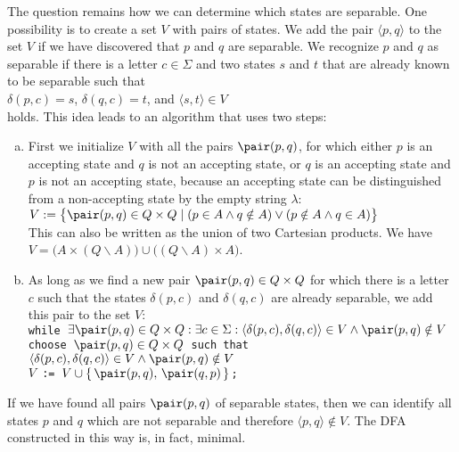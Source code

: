 The question remains how we can determine which states are separable.
One possibility is to create a set $V$ with pairs of states.  We add the pair $\langle p, q \rangle$ to the set
$V$ if we have discovered that $p$ and $q$ are separable.  We recognize $p$ and $q$ as separable if
there is a letter $c\in\Sigma$ and two states $s$ and $t$ that are already known to be separable such that 
\\[0.2cm]
\hspace*{1.3cm}
$\delta(p,c) = s$, \quad $\delta(q,c) = t$, \quad and \quad $\langle s, t \rangle \in V$
\\[0.2cm]
holds. This idea leads to an algorithm that uses two steps:
\begin{enumerate}[(a)]
\item First we initialize $V$ with all the pairs $\pair(p,q)$, for which either $p$ is an accepting state and
      $q$ is not an accepting state, or $q$ is an accepting state and $p$ is not an accepting state,
      because an accepting state can be distinguished from a non-accepting state by the empty string
      $\lambda$: 
      \\[0.2cm]
      \hspace*{1.3cm}
      $V := \bigl\{\pair(p,q) \in Q \times Q \mid (p \in A \wedge q \notin A) \vee 
      (p \notin A \wedge q \in A) \bigr\}$
      \\[0.2cm]
      This can also be written as the union of two Cartesian products. We have
      \\[0.2cm]
      \hspace*{1.3cm}
      $V = \bigl(A \times (Q \backslash A)\bigr) \cup \bigl((Q \backslash A) \times A\bigr)$.
\item As long as we find a new pair $\pair(p,q) \in Q \times Q$ for which there is a letter $c$ such that the
      states $\delta(p,c)$ and $\delta(q,c)$ are already separable, we add this pair to the set $V$:  
      \\[0.2cm]
      \hspace*{1.3cm} 
      \texttt{while $\exists \pair(p,q) \in Q \times Q: \exists c \in \Sigma:\langle\delta(p,c),
        \delta(q,c)\rangle \in V \wedge \pair(p,q) \notin V$ } \\
      \hspace*{1.8cm}
      \texttt{choose $\pair(p,q) \in Q \times Q$ such that} $\langle\delta(p,c),
      \delta(q,c)\rangle \in V \wedge \pair(p,q) \notin V$ \\
      \hspace*{2.3cm}
      \texttt{$V$ := $V \cup \{\, \pair(p,q),\, \pair(q,p)\, \}$;} \\
\end{enumerate}
If we have found all pairs $\pair(p,q)$ of separable states, then we can identify all states $p$ and $q$
which are not separable and therefore $\langle p, q \rangle \not\in V$.   The \textsc{DFA} constructed in
this way is, in fact, minimal.  

